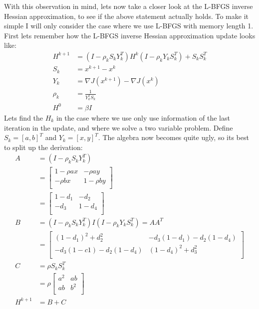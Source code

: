\documentclass[11pt,a4paper]{article}
\begin{document}
With this observation in mind, lets now take a closer look at the L-BFGS inverse Hessian approximation, to see if the above statement actually holds. To make it simple I will only consider the case where we use L-BFGS with memory length 1. First lets remember how the L-BFGS inverse Hessian approximation update looks like:
\begin{align*}
H^{k+1} &= (I-\rho_kS_kY_k^T)H^k(I-\rho_kY_kS_k^T) + S_kS_k^T\\
S_k &= x^{k+1}-x^{k} \\
Y_k &= \nabla J(x^{k+1})-\nabla J(x^{k})\\
\rho_k &= \frac{1}{Y_k^TS_k} \\
H^0 &= \beta I
\end{align*}
Lets find the $H_k$ in the case where we use only use information of the last iteration in the update, and where we solve a two variable problem. Define $S_k=[a,b]^T$ and $Y_k=[x,y]^T$. The algebra now becomes quite ugly, so its best to split up the derivation:
\begin{align*}
A &= (I-\rho_kS_kY_k^T) \\
&=\left[ \begin{array}{cc}
   	1-\rho ax & -\rho ay\\
    	-\rho bx& 1-\rho by\\
   \end{array}  \right] \\
&=\left[ \begin{array}{cc}
   	1-d_1 & -d_2\\
    	-d_3& 1-d_4\\
   \end{array}  \right] \\
B &= (I-\rho_kS_kY_k^T)I(I-\rho_kY_kS_k^T) = AA^T \\
&=\left[ \begin{array}{cc}
   	(1-d_1)^2 + d_2^2& -d_3(1-d_1) -d_2(1-d_4)\\
    	-d_3(1-c1)-d_2(1-d_4)& (1-d_4)^2 +d_3^2\\
   \end{array}  \right] \\
C&= \rho S_kS_k^T \\
&=\rho\left[ \begin{array}{cc}
   	a^2  & ab\\
    	ab& b^2\\
   \end{array}  \right] \\
H^{k+1}&=B+C
\end{align*}
\end{document}
